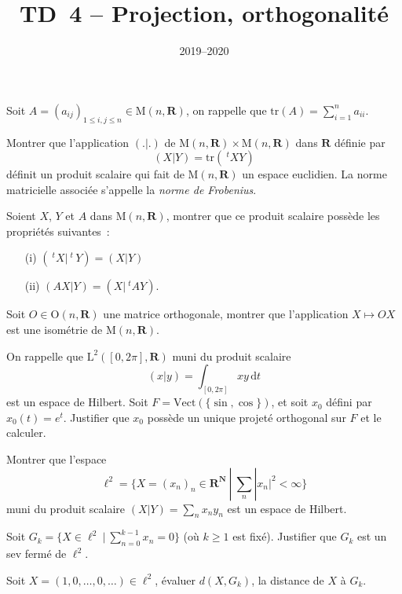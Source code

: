 \documentclass[11pt,a4paper]{article}
\title{TD~4 -- Projection, orthogonalit\'e}
\date{2019--2020}
\def\N{\mathbf{N}}
\def\R{\mathbf{R}}
\def\L{\mathrm{L}}
\def\M{\mathrm{M}}
\def\O{\mathrm{O}}
\def\tr{\mathrm{tr}}
\def\Vect{\mathrm{Vect}}
\def\iy{\infty}
\def\t{\ \!^t\!}
\begin{document}
\maketitle

\begin{Exercice}
Soit $A = (a_{ij})_{1 \leq i,j \leq n} \in \M(n,\R)$, on
rappelle que $\tr(A)=\sum_{i=1}^n a_{ii}$.
\begin{Question}
Montrer que l'application $(.|.)$ de $\M(n,\R) \times
\M(n,\R)$ dans $\R$ d\'efinie par
$$ (X|Y) = \tr(\t XY) $$
d\'efinit un produit scalaire qui fait de $\M(n,\R)$ un espace euclidien.
La norme matricielle associ\'ee s'appelle la \emph{norme de Frobenius}.
\end{Question}
\begin{Question} Soient $X$, $Y$ et $A$ dans $\M(n,\R)$, montrer que ce
produit scalaire poss\`ede les propri\'et\'es suivantes~:
\begin{itemize}
  \item[(i)]  $(\t X|\t\,Y) = (X|Y)$
  \item[(ii)] $(AX|Y) = (X|\t AY).$
\end{itemize}
\end{Question}
\begin{Question} Soit $O \in \O(n,\R)$ une matrice orthogonale, montrer
que l'application $X \mapsto OX$ est une isom\'etrie de $\M(n,\R)$.
\end{Question}
\end{Exercice} \vspace*{1em}

\begin{Exercice}
On rappelle que $\L^2([0,2\pi],\R)$ muni du produit scalaire
$$ (x|y) = \int_{[0,2\pi]} xy\,\mathrm{d}t $$
est un espace de Hilbert.
Soit $F = \Vect(\{\sin,\cos\})$, et soit $x_0$ d\'efini par
$x_0(t)=e^t$. Justifier que $x_0$ poss\`ede un unique projet\'e
orthogonal sur $F$ et le calculer.
\end{Exercice} \vspace*{1em}

\begin{Exercice}
\begin{Question} Montrer que l'espace
$$ \ell^2=\{X=(x_n)_n \in \R^\N\ |\ \sum_n |x_n|^2<\iy\} $$
muni du produit scalaire $(X|Y) = \sum_n x_n y_n$
est un espace de Hilbert. \end{Question}
\begin{Question} Soit $G_k = \{X \in \ell^2\ |\ \sum_{n=0}^{k-1} x_n = 0\}$
(o\`u $k \geq 1$ est fix\'e). Justifier que $G_k$ est un sev ferm\'e de
$\ell^2$. \end{Question}
\begin{Question} Soit $X=(1,0,\dots,0,\dots) \in \ell^2$, \'evaluer
$d(X,G_k)$, la distance de $X$ \`a $G_k$. \end{Question}
\end{Exercice} \vspace*{1em}
\end{document}
